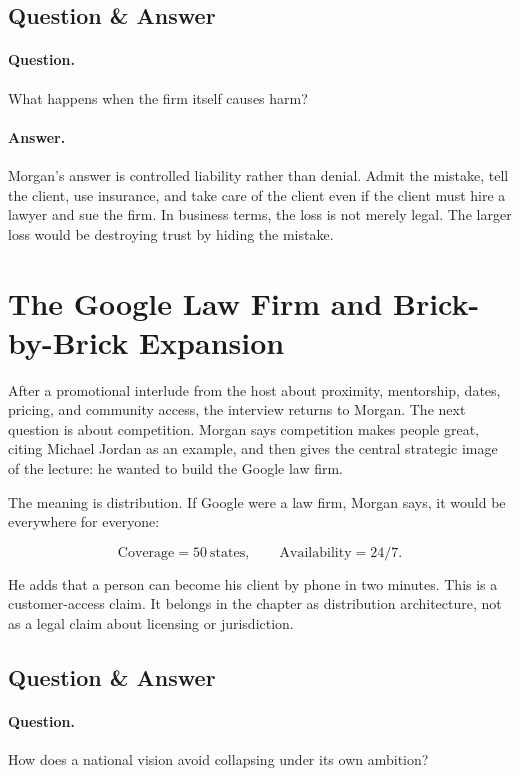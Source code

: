 \subsection{Question \& Answer}

\paragraph{Question.}
What happens when the firm itself causes harm?

\paragraph{Answer.}
Morgan's answer is controlled liability rather than denial. Admit the mistake, tell the client, use insurance, and take care of the client even if the client must hire a lawyer and sue the firm. In business terms, the loss is not merely legal. The larger loss would be destroying trust by hiding the mistake.

\section{The Google Law Firm and Brick-by-Brick Expansion}

After a promotional interlude from the host about proximity, mentorship, dates, pricing, and community access, the interview returns to Morgan. The next question is about competition. Morgan says competition makes people great, citing Michael Jordan as an example, and then gives the central strategic image of the lecture: he wanted to build the Google law firm.

The meaning is distribution. If Google were a law firm, Morgan says, it would be everywhere for everyone:

\begin{equation}
\mathrm{Coverage}=50\ \mathrm{states},
\qquad
\mathrm{Availability}=24/7.
\end{equation}

He adds that a person can become his client by phone in two minutes. This is a customer-access claim. It belongs in the chapter as distribution architecture, not as a legal claim about licensing or jurisdiction.

\subsection{Question \& Answer}

\paragraph{Question.}
How does a national vision avoid collapsing under its own ambition?

